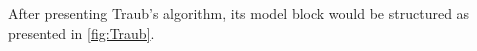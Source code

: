 \documentclass{Format}
\begin{document}

After presenting Traub's algorithm, its model block would be structured as presented in \autoref{fig:Traub}.
\end{document}
